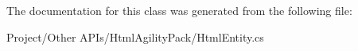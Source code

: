 The documentation for this class was generated from the following file\+:\begin{DoxyCompactItemize}
\item 
Project/\+Other A\+P\+Is/\+Html\+Agility\+Pack/Html\+Entity.\+cs\end{DoxyCompactItemize}
